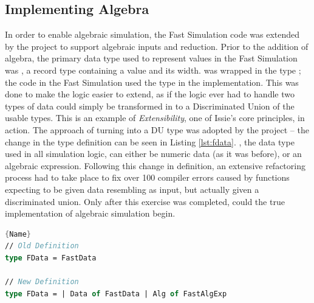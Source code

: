 \subsection{Implementing Algebra}

In order to enable algebraic simulation, the Fast Simulation code was extended by the project to support algebraic inputs and reduction. 
Prior to the addition of algebra, the primary data type used to represent values in the Fast Simulation was , a record type containing a value and its width.  was wrapped in the type ; the code in the Fast Simulation used the  type in the implementation. This was done to make the logic easier to extend, as if the logic ever had to handle two types of data  could simply be transformed in to a Discriminated Union of the usable types. This is an example of \textit{Extensibility}, one of Issie's core principles, in action. The approach of turning  into a DU type was adopted by the project -- the change in the type definition can be seen in Listing \ref{lst:fdata}. , the data type used in all simulation logic, can either be numeric data (as it was before), or an algebraic expression. Following this change in definition, an extensive refactoring process had to take place to fix over 100 compiler errors caused by functions expecting to be given data resembling  as input, but actually given a discriminated union. Only after this exercise was completed, could the true implementation of algebraic simulation begin. 
\begin{lstlisting}[caption=Change in definition of \codestyle{FData},frame=tlrb, language=FSharp, label=lst:fdata]{Name}
// Old Definition
type FData = FastData

// New Definition
type FData = | Data of FastData | Alg of FastAlgExp
\end{lstlisting}

